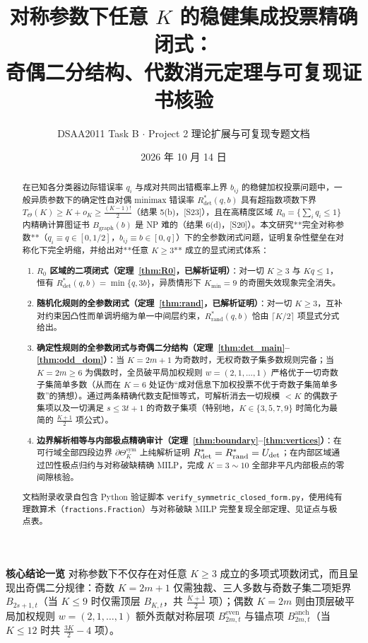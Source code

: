 \documentclass[11pt,a4paper]{article}
\title{\textbf{\color{primary}对称参数下任意 $K$ 的稳健集成投票精确闭式：\\奇偶二分结构、代数消元定理与可复现证书核验}}
\author{DSAA2011 Task B $\cdot$ Project 2 理论扩展与可复现专题文档}
\date{2026 年 10 月 14 日}
\theoremstyle{definition}
\theoremstyle{remark}
\newcommand{\takeaway}[2]{%
  \vspace{4pt}\noindent\colorbox{primary!6}{%
    \parbox{\dimexpr\textwidth-2\fboxsep\relax}{%
      \vspace{4pt}\textbf{\color{primary}#1}\hspace{0.5em}#2\vspace{4pt}%
    }%
  }\vspace{4pt}%
}
\newcommand{\Rdet}{R^*_{\mathrm{det}}}
\newcommand{\Rrand}{R^*_{\mathrm{rand}}}
\newcommand{\Bg}{B_{\mathrm{graph}}}
\newcommand{\Thetasym}{\Theta^{\mathrm{sym}}_K}
\begin{document}
\sloppy
\maketitle

\begin{abstract}
在已知各分类器边际错误率 $q_i$ 与成对共同出错概率上界 $b_{ij}$ 的稳健加权投票问题中，一般异质参数下的确定性自对偶 minimax 错误率 $\Rdet(q,b)$ 具有超指数项数下界 $T_\Theta(K) \ge K + o_K \ge \frac{(K-1)!}{2}$（结果 5(b)，[S23]），且在高精度区域 $R_0 = \{\sum_i q_i \le 1\}$ 内精确计算图证书 $\Bg(b)$ 是 NP 难的（结果 6(d)，[S20]）。本文研究**完全对称参数**（$q_i \equiv q \in [0, 1/2]$，$b_{ij} \equiv b \in [0, q]$）下的全参数闭式问题，证明复杂性壁垒在对称化下完全坍缩，并给出对**任意 $K \ge 3$** 成立的显式闭式体系：
\begin{enumerate}
  \setlength{\itemsep}{2pt}\setlength{\parskip}{0pt}
  \item \textbf{$R_0$ 区域的二项闭式（定理~\ref{thm:R0}，已解析证明）}：对一切 $K \ge 3$ 与 $Kq \le 1$，恒有 $\Rdet(q, b) = \min\{q, 3b\}$，异质情形下 $K_{\min}=9$ 的奇圈失效现象完全消失。
  \item \textbf{随机化规则的全参数闭式（定理~\ref{thm:rand}，已解析证明）}：对一切 $K \ge 3$，互补对约束因凸性而单调坍缩为单一中间层约束，$\Rrand(q,b)$ 恰由 $\lceil K/2 \rceil$ 项显式分式给出。
  \item \textbf{确定性规则的全参数闭式与奇偶二分结构（定理~\ref{thm:det_main}--\ref{thm:odd_dom}）}：当 $K=2m+1$ 为奇数时，无权奇数子集多数规则完备；当 $K=2m \ge 6$ 为偶数时，全员破平局加权规则 $w=(2,1,\dots,1)$ 严格优于一切奇数子集简单多数（从而在 $K=6$ 处证伪“成对信息下加权投票不优于奇数子集简单多数”的猜想）。通过两条精确代数支配恒等式，可解析消去一切规模 $<K$ 的偶数子集项以及一切满足 $s \le 3t+1$ 的奇数子集项（特别地，$K \in \{3,5,7,9\}$ 时简化为最简的 $\frac{K+1}{2}$ 项公式）。
  \item \textbf{边界解析相等与内部极点精确审计（定理~\ref{thm:boundary}--\ref{thm:vertices}）}：在可行域全部四段边界 $\partial\Thetasym$ 上纯解析证明 $\Rdet = \Rrand = U_{\rm det}$；在内部区域通过凹性极点归约与对称破缺精确 MILP，完成 $K = 3 \sim 10$ 全部非平凡内部极点的零间隙核验。
\end{enumerate}
文档附录收录自包含 Python 验证脚本 \texttt{verify\_symmetric\_closed\_form.py}，使用纯有理数算术（\texttt{fractions.Fraction}）与对称破缺 MILP 完整复现全部定理、见证点与极点表。
\end{abstract}

\takeaway{核心结论一览}{
对称参数下不仅存在对任意 $K \ge 3$ 成立的多项式项数闭式，而且呈现出奇偶二分规律：奇数 $K=2m+1$ 仅需独裁、三人多数与奇数子集二项矩界 $B_{2s+1,t}$（当 $K \le 9$ 时仅需顶层 $B_{K,t}$，共 $\frac{K+1}{2}$ 项）；偶数 $K=2m$ 则由顶层破平局加权规则 $w=(2,1,\dots,1)$ 额外贡献对称层项 $B^{\mathrm{even}}_{2m,t}$ 与锚点项 $B^{\mathrm{anch}}_{2m,t}$（当 $K \le 12$ 时共 $\frac{3K}{2}-4$ 项）。
}
\end{document}
